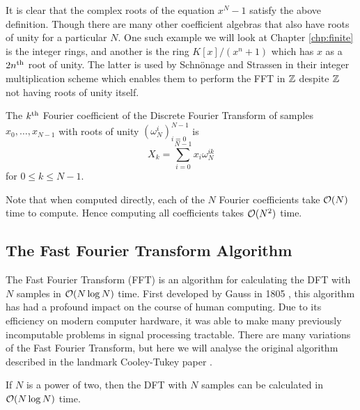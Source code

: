 It is clear that the complex roots of the equation $x^N - 1$ satisfy the above definition. Though there are many other coefficient algebras that also have roots of unity for a particular $N$. One such example we will look at Chapter \ref{chp:finite} is the integer rings, and another is the ring $K[x]/(x^n + 1)$ which has $x$ as a $2n^{\textrm{th}}$ root of unity. The latter is used by Schn\"{o}nage and Strassen in their integer multiplication scheme which enables them to perform the FFT in ${\mathbb Z}$ despite ${\mathbb Z}$ not having roots of unity itself.

\begin{definition}
    The $k^{\textrm{th}}$ Fourier coefficient of the Discrete Fourier Transform of samples $x_0, \ldots, x_{N-1}$ with roots of unity $(\omega_N^i)_{i=0}^{N-1}$ is
\[
    X_k = \sum^{N-1}_{i=0}x_i\omega_{N}^{ik}
\]
for $0 \leq k \leq N-1$.
\end{definition}

Note that when computed directly, each of the $N$ Fourier coefficients take $\mathcal O(N)$ time to compute. Hence computing all coefficients takes $\mathcal O(N^2)$ time.


\subsection{The Fast Fourier Transform Algorithm}

The Fast Fourier Transform (FFT) is an algorithm for calculating the DFT with $N$ samples in $\mathcal O(N \log N)$ time. First developed by Gauss in 1805 \cite{gauss}, this algorithm has had a profound impact on the course of human computing. Due to its efficiency on modern computer hardware, it was able to make many previously incomputable problems in signal processing tractable.
There are many variations of the Fast Fourier Transform, but here we will analyse the original algorithm described in the landmark Cooley-Tukey paper \cite{fft}.

\begin{theorem}\label{thm:fft}
    If $N$ is a power of two, then the DFT with $N$ samples can be calculated in $\mathcal O(N\log N)$ time.
\end{theorem}

